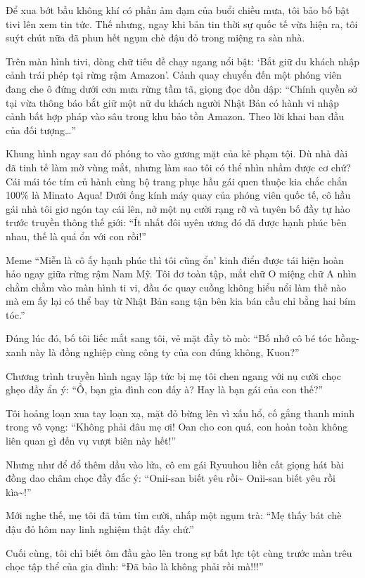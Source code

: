 \documentclass[../main.tex]{subfiles}
\begin{document}
Để xua bớt bầu không khí có phần ảm đạm của buổi chiều mưa, tôi bảo bố bật tivi lên xem tin tức. Thế nhưng, ngay khi bản tin thời sự quốc tế vừa hiện ra, tôi suýt chút nữa đã phun hết ngụm chè đậu đỏ trong miệng ra sàn nhà.

Trên màn hình tivi, dòng chữ tiêu đề chạy ngang nổi bật: `Bắt giữ du khách nhập cảnh trái phép tại rừng rậm Amazon'. Cảnh quay chuyển đến một phóng viên đang che ô đứng dưới cơn mưa rừng tầm tã, giọng đọc dồn dập: ``Chính quyền sở tại vừa thông báo bắt giữ một nữ du khách người Nhật Bản có hành vi nhập cảnh bất hợp pháp vào sâu trong khu bảo tồn Amazon. Theo lời khai ban đầu của đối tượng\dots''

Khung hình ngay sau đó phóng to vào gương mặt của kẻ phạm tội. Dù nhà đài đã tinh tế làm mờ vùng mắt, nhưng làm sao tôi có thể nhìn nhầm được cơ chứ? Cái mái tóc tím củ hành cùng bộ trang phục hầu gái quen thuộc kia chắc chắn 100\% là Minato Aqua! Dưới ống kính máy quay của phóng viên quốc tế, cô hầu gái nhà tôi giơ ngón tay cái lên, nở một nụ cười rạng rỡ và tuyên bố đầy tự hào trước truyền thông thế giới: ``Ít nhất đôi uyên ương đó đã được hạnh phúc bên nhau, thế là quá ổn với con rồi!''

Meme ``Miễn là cô ấy hạnh phúc thì tôi cũng ổn' kinh điển được tái hiện hoàn hảo ngay giữa rừng rậm Nam Mỹ. Tôi đơ toàn tập, mắt chữ O miệng chữ A nhìn chằm chằm vào màn hình ti vi, đầu óc quay cuồng không hiểu nổi làm thế nào mà em ấy lại có thể bay từ Nhật Bản sang tận bên kia bán cầu chỉ bằng hai bím tóc.''

Đúng lúc đó, bố tôi liếc mắt sang tôi, vẻ mặt đầy tò mò: ``Bố nhớ cô bé tóc hồng-xanh này là đồng nghiệp cùng công ty của con đúng không, Kuon?''

Chương trình truyền hình ngay lập tức bị mẹ tôi chen ngang với nụ cười chọc ghẹo đầy ẩn ý: ``Ồ, bạn gia đình con đấy à? Hay là bạn gái của con thế?''

Tôi hoảng loạn xua tay loạn xạ, mặt đỏ bừng lên vì xấu hổ, cố gắng thanh minh trong vô vọng: ``Không phải đâu mẹ ơi! Oan cho con quá, con hoàn toàn không liên quan gì đến vụ vượt biên này hết!''

Nhưng như để đổ thêm dầu vào lửa, cô em gái Ryuuhou liền cất giọng hát bài đồng dao châm chọc đầy đắc ý: ``Onii-san biết yêu rồi\~{} Onii-san biết yêu rồi kìa\~{}!''

Mới nghe thế, mẹ tôi đã tủm tỉm cười, nhấp một ngụm trà: ``Mẹ thấy bát chè đậu đỏ hôm nay linh nghiệm thật đấy chứ.''

Cuối cùng, tôi chỉ biết ôm đầu gào lên trong sự bất lực tột cùng trước màn trêu chọc tập thể của gia đình: ``Đã bảo là không phải rồi mà!!!''
\end{document}
